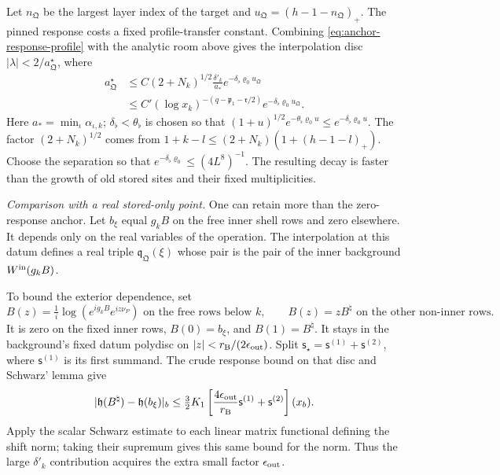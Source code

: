 \documentclass[11pt,letterpaper,reqno]{amsart}
\theoremstyle{definition}
\theoremstyle{remark}
\begin{document}
Let \(n_{\mathfrak Q}\) be the largest layer index of
the target and \(u_{\mathfrak Q}=(h-1-n_{\mathfrak Q})_+\).
The pinned response costs a fixed profile-transfer
constant. Combining \eqref{eq:anchor-response-profile}
with the analytic room above gives the interpolation
disc \(|\lambda|<2/a^\star_{\mathfrak Q}\), where
\begin{equation}\label{eq:anchor-explicit-amplitude}
 \begin{split}
 a^\star_{\mathfrak Q}
 &\le C(2+N_k)^{1/2}\frac{\delta'_k}{a_*}
                       e^{-\delta_\flat\varrho_0u_{\mathfrak Q}}\\
 &\le C'(\log x_k)^{-(q-\mathfrak p_1-\mathfrak r/2)}
                       e^{-\delta_\flat\varrho_0u_{\mathfrak Q}} .
 \end{split}
\end{equation}
Here \(a_*=\min_\iota\alpha_{\iota,k}\);
\(\delta_\flat<\theta_\flat\) is chosen so that
\((1+u)^{1/2}e^{-\theta_\flat\varrho_0u}
\le e^{-\delta_\flat\varrho_0u}\).
The factor \((2+N_k)^{1/2}\) comes from
\(1+k-l\le(2+N_k)(1+(h-1-l)_+)\).
Choose the separation so that
\(e^{-\delta_\flat\varrho_0}\le(4L^8)^{-1}\).
The resulting decay is faster than the growth of old
stored sites and their fixed multiplicities.

\emph{Comparison with a real stored-only point.}
One can retain more than the zero-response anchor.
Let \(b_\xi\) equal \(g_kB\) on the free inner
shell rows and zero elsewhere. It depends only on
the real variables of the operation. The interpolation
at this datum defines a real triple \(\mathfrak q_{\mathfrak Q}(\xi)\)
whose pair is the pair of the inner background
\(W^{\rm in}(g_kB)\).

To bound the exterior dependence, set
\[
 B(z)=\tfrac1i\log(e^{ig_kB}e^{iz\nu_P})
       \text{ on the free rows below }k,\qquad
 B(z)=zB^\natural\text{ on the other non-inner rows}.
\]
It is zero on the fixed inner rows,
\(B(0)=b_\xi\), and \(B(1)=B^\natural\).
It stays in the background's fixed datum polydisc on
\(|z|<r_{\rm B}/(2\epsilon_{\rm out})\).
Split \(\mathsf s_\star=\mathsf s^{(1)}+\mathsf s^{(2)}\),
where \(\mathsf s^{(1)}\) is its first summand.
The crude response bound on that disc and Schwarz'
lemma give
\[
 |\mathfrak h(B^\natural)-\mathfrak h(b_\xi)|_b
 \le\tfrac32K_1\left[
       \frac{4\epsilon_{\rm out}}{r_{\rm B}}\mathsf s^{(1)}
                                 +\mathsf s^{(2)}\right](x_b).
\]
Apply the scalar Schwarz estimate to each linear
matrix functional defining the shift norm; taking
their supremum gives this same bound for the norm.
Thus the large \(\delta'_k\) contribution acquires
the extra small factor \(\epsilon_{\rm out}\).
\end{document}
